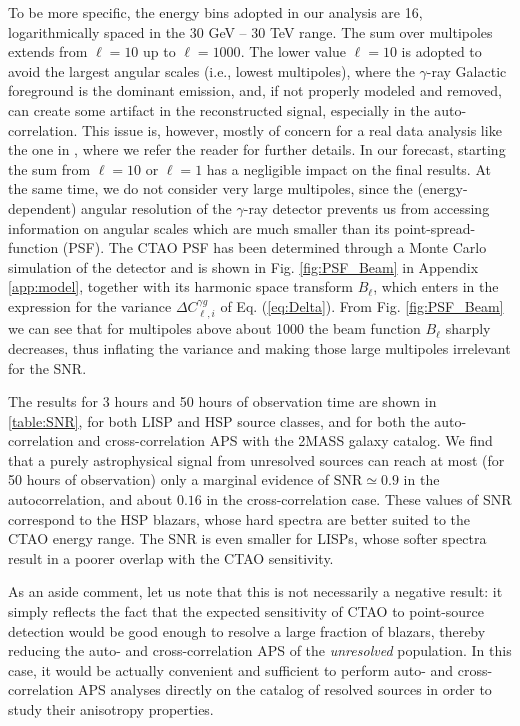 \documentclass[aps,prd,a4paper,reprint,nofootinbib,superscriptaddress,floatfix,preprintnumbers]{revtex4-2}
\let\Delta\varDelta
\begin{document}
To be more specific, the energy bins adopted in our analysis are 16, logarithmically spaced in the 30 GeV – 30 TeV range.
The sum over multipoles extends from $\ell = 10$ up to $\ell = 1000$. The lower value $\ell = 10$ is adopted to avoid the largest angular scales (i.e., lowest multipoles),
where the $\gamma$-ray Galactic foreground is the dominant emission, and, if not properly modeled and removed, can create some artifact in the reconstructed signal, especially in the auto-correlation. This issue is, however, mostly of concern for a real data analysis like the one in \cite{Fermi-LAT:2018udj}, where we refer the reader for further details. In our forecast, starting the sum from $\ell=10$ or $\ell=1$ has a negligible impact on the final results.
At the same time, we do not consider very large multipoles, since the (energy-dependent) angular resolution of the $\gamma$-ray detector prevents us from accessing information on angular scales which are much smaller than its point-spread-function (PSF). The CTAO PSF has been determined through a Monte Carlo simulation of the detector and is shown in Fig. \ref{fig:PSF_Beam} in Appendix \ref{app:model}, together with its harmonic space transform $B_\ell$, which enters in the expression for the variance $\Delta C_{\ell, i}^{\gamma g}$ of Eq. (\ref{eq:Delta}). From Fig. \ref{fig:PSF_Beam} we can see that for multipoles above about 1000 the beam function $B_\ell$ sharply decreases, thus inflating the variance and making those large multipoles irrelevant for the SNR.

The results for 3 hours and 50 hours of observation time are shown in \cref{table:SNR}, for both LISP and HSP source classes, and for both the auto-correlation and cross-correlation APS with the 2MASS galaxy catalog. We find that a purely astrophysical signal from unresolved sources can reach at most (for 50 hours of observation) only a marginal evidence of $\textrm{SNR} \simeq 0.9$ in the autocorrelation, and about $0.16$ in the cross-correlation case.   
These values of SNR correspond to the HSP blazars, whose hard spectra are better suited to the CTAO energy range. The SNR is even smaller for LISPs, whose softer spectra result in a poorer overlap with the CTAO sensitivity. 

As an aside comment, let us note that this is not necessarily a negative result: it simply reflects the fact that the expected sensitivity of CTAO to point-source detection would be good enough to resolve a large fraction of blazars, thereby reducing the auto- and cross-correlation APS of the \textsl{unresolved} population. In this case, it would be actually convenient and sufficient to perform auto- and cross-correlation APS analyses directly on the catalog of resolved sources in order to study their anisotropy properties. 
\end{document}
